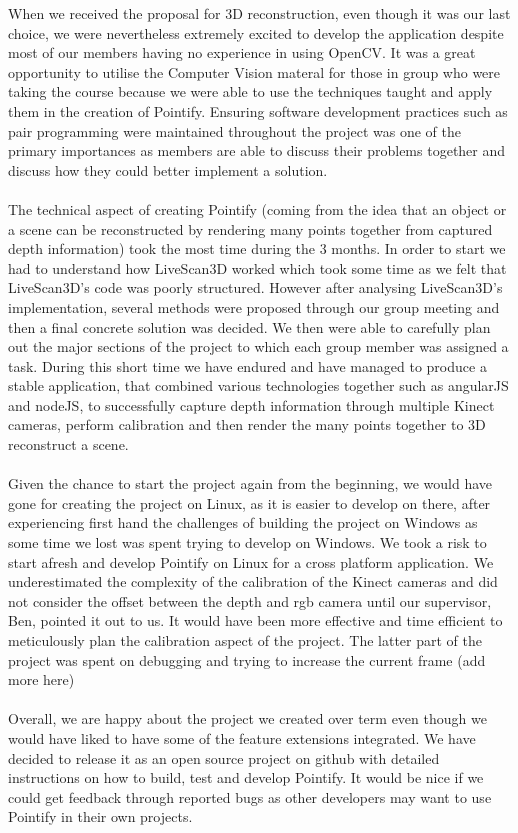 \documentclass{article}
\begin{document}
When we received the proposal for 3D reconstruction, even though it was our last choice, we were nevertheless extremely excited to develop the application despite most of our members having no experience in using OpenCV. It was a great opportunity to utilise the Computer Vision materal for those in group who were taking the course because we were able to use the techniques taught and apply them in the creation of Pointify. Ensuring software development practices such as pair programming were maintained throughout the project was one of the primary importances as members are able to discuss their problems together and discuss how they could better implement a solution.
\\\\
The technical aspect of creating Pointify (coming from the idea that an object or a scene can be reconstructed by rendering many points together from captured depth information) took the most time during the 3 months. In order to start we had to understand how LiveScan3D worked which took some time as we felt that LiveScan3D's code was poorly structured. However after analysing LiveScan3D's implementation, several methods were proposed through our group meeting and then a final concrete solution was decided. We then were able to carefully plan out the major sections of the project to which each group member was assigned a task. During this short time we have endured and have managed to produce a stable application, that combined various technologies together such as angularJS and nodeJS, to successfully capture depth information through multiple Kinect cameras, perform calibration and then render the many points together to 3D reconstruct a scene. 
\\\\
Given the chance to start the project again from the beginning, we would have gone for creating the project on Linux, as it is easier to develop on there, after experiencing first hand the challenges of building the project on Windows as some time we lost was spent trying to develop on Windows. We took a risk to start afresh and develop Pointify on Linux for a cross platform application. We underestimated the complexity of the calibration of the Kinect cameras and did not consider the offset between the depth and rgb camera until our supervisor, Ben, pointed it out to us. It would have been more effective and time efficient to meticulously plan the calibration aspect of the project. The latter part of the project was spent on debugging and trying to increase the current frame (add more here)
\\\\
Overall, we are happy about the project we created over term even though we would have liked to have some of the feature extensions integrated. We have decided to release it as an open source project on github with detailed instructions on how to build, test and develop Pointify. It would be nice if we could get feedback through reported bugs as other developers may want to use Pointify in their own projects.
\end{document}

